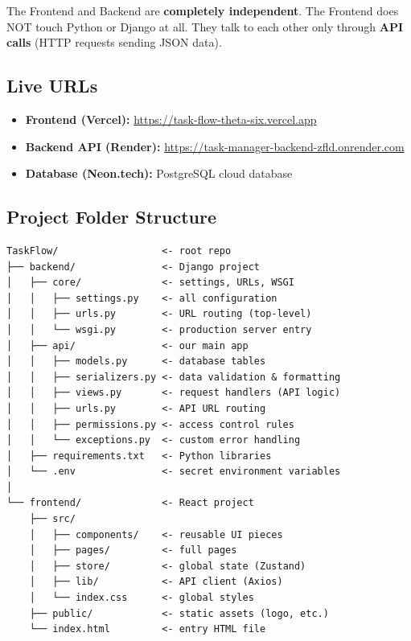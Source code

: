 \documentclass[12pt,a4paper]{article}
\begin{document}
\begin{notebox}
The Frontend and Backend are \textbf{completely independent}. The Frontend does NOT touch Python or Django at all. They talk to each other only through \textbf{API calls} (HTTP requests sending JSON data).
\end{notebox}

\subsection{Live URLs}
\begin{itemize}
    \item \textbf{Frontend (Vercel):} \url{https://task-flow-theta-six.vercel.app}
    \item \textbf{Backend API (Render):} \url{https://task-manager-backend-zfld.onrender.com}
    \item \textbf{Database (Neon.tech):} PostgreSQL cloud database
\end{itemize}

\subsection{Project Folder Structure}
\begin{lstlisting}
TaskFlow/                  <- root repo
├── backend/               <- Django project
│   ├── core/              <- settings, URLs, WSGI
│   │   ├── settings.py    <- all configuration
│   │   ├── urls.py        <- URL routing (top-level)
│   │   └── wsgi.py        <- production server entry
│   ├── api/               <- our main app
│   │   ├── models.py      <- database tables
│   │   ├── serializers.py <- data validation & formatting
│   │   ├── views.py       <- request handlers (API logic)
│   │   ├── urls.py        <- API URL routing
│   │   ├── permissions.py <- access control rules
│   │   └── exceptions.py  <- custom error handling
│   ├── requirements.txt   <- Python libraries
│   └── .env               <- secret environment variables
│
└── frontend/              <- React project
    ├── src/
    │   ├── components/    <- reusable UI pieces
    │   ├── pages/         <- full pages
    │   ├── store/         <- global state (Zustand)
    │   ├── lib/           <- API client (Axios)
    │   └── index.css      <- global styles
    ├── public/            <- static assets (logo, etc.)
    └── index.html         <- entry HTML file
\end{lstlisting}


\end{document}
